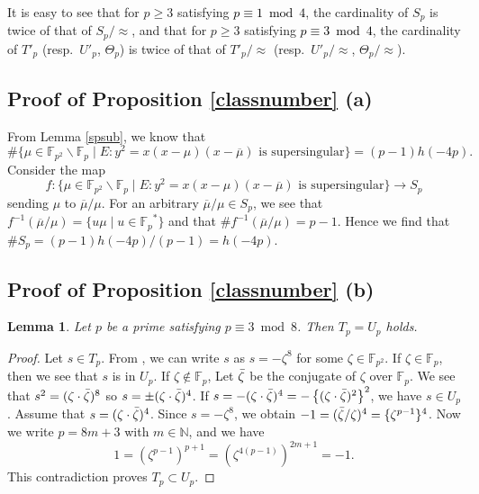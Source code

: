 \documentclass[10pt,a4paper]{amsart}
\theoremstyle{plain}
\newtheorem{lem}[defn]{Lemma}
\newcommand{\fp}{\mathbb{F}_p}
\newcommand{\fpp}{\mathbb{F}_{p^2}}
\begin{document}

It is easy to see that for $p \ge 3$ satisfying \textcolor{black}{$p \equiv 1 \bmod 4$}, the cardinality of $S_p$ is twice of that of $S_p/\approx$, and that for $p \ge 3$ satisfying \textcolor{black}{ $p \equiv 3 \bmod 4$}, the cardinality of $T'_p$ (resp.\ $U'_p$, $\Theta_p$) is twice of that of $T'_p/\approx$ (resp.\ $U'_p/\approx$, $\Theta_p/\approx$). 




\subsection{Proof of Proposition {\ref{classnumber}} (a)}
\label{kakkoitinituite}
From Lemma \ref{spsub}, we know that 
 \[
 \#\{\mu \in \fpp \smallsetminus \fp \mid E:y^2=x(x-\mu)(x-\overline{\mu}) \text{ is supersingular} \}=(p-1)h(-4p).
 \]
 Consider the map
 \[
  f: \{\mu \in \fpp \smallsetminus \fp \mid E:y^2=x(x-\mu)(x-\overline{\mu}) \text{ is supersingular} \} \longrightarrow S_p
 \]
 sending $\mu$ to $\overline{\mu}/\mu$.
 For an arbitrary $\overline{\mu}/\mu \in S_p$, we see that ${f}^{-1}(\overline{\mu}/\mu)=\{u\mu \mid u \in {\fp}^{*} \}$ and that $\#{f}^{-1}(\overline{\mu}/\mu)=p-1$.
Hence we find that $\# S_p=(p-1)h(-4p)/(p-1)=h(-4p)$.


\subsection{Proof of Proposition {\ref{classnumber}} (b)}
\begin{lem}
\label{tpup}
    Let $p$ be a prime satisfying $p \equiv3 \bmod 8$. Then $T_p=U_p$ holds.
\end{lem}
\begin{proof}
   Let $s \in T_p$. From \cite[Proposition 3.1]{AT02}, we can write $s$ as $s=-{\zeta}^8$ for some $\zeta \in \fpp$. If $\zeta \in \fp$, then we see that $s$ is in $U_p$. If $\zeta \notin \fp$, Let $\Bar{\zeta}$ be the conjugate of $\zeta$ over $\fp$. We see that
    $
    s^2=( \zeta\cdot\Bar{\zeta} )^8 $ so $ s=\pm(\zeta\cdot\Bar{\zeta})^4$.
 If $s=-(\zeta\cdot\Bar{\zeta})^4=-\left\{ (\zeta\cdot\Bar{\zeta})^2\right\}^2$, we have $s \in U_p$. Assume that $s=(\zeta\cdot\Bar{\zeta})^4$. Since $s=-{\zeta}^8$, we obtain $-1=(\Bar{\zeta}/\zeta)^4=\{{\zeta}^{p-1}\}^4$. Now we write $p=8m+3$ with $m \in \mathbb{N}$, and we have
    \[
   1= \left({\zeta}^{p-1} \right)^{p+1}= \left({\zeta}^{4(p-1)} \right)^{ 2m+1}=-1.
    \]
    This contradiction proves $T_p \subset U_p$. 
\end{proof}
\end{document}
